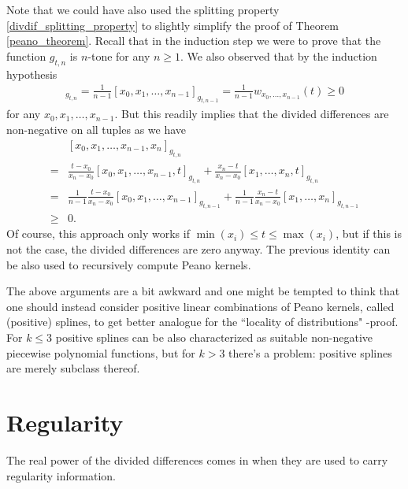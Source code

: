Note that we could have also used the splitting property \ref{divdif_splitting_property} to slightly simplify the proof of Theorem \ref{peano_theorem}. Recall that in the induction step we were to prove that the function $g_{t, n}$ is $n$-tone for any $n \geq 1$. We also observed that by the induction hypothesis
\begin{align*}
	[x_{0}, x_{1}, \ldots, x_{n - 1}, t]_{g_{t, n}} = \frac{1}{n - 1}[x_{0}, x_{1}, \ldots, x_{n - 1}]_{g_{t, n - 1}} =  \frac{1}{n - 1} w_{x_{0}, \ldots, x_{n - 1}}(t)\geq 0
\end{align*}
for any $x_{0}, x_{1}, \ldots, x_{n - 1}$. But this readily implies that the divided differences are non-negative on all tuples as we have
\begin{align*}
	& [x_{0}, x_{1}, \ldots, x_{n - 1}, x_{n}]_{g_{t, n}} \\
	=& \frac{t - x_{0}}{x_{n} - x_{0}} [x_{0}, x_{1}, \ldots, x_{n - 1}, t]_{g_{t, n}} + \frac{x_{n} - t}{x_{n} - x_{0}} [x_{1}, \ldots, x_{n}, t]_{g_{t, n}} \\
	=& \frac{1}{n - 1} \frac{t - x_{0}}{x_{n} - x_{0}} [x_{0}, x_{1}, \ldots, x_{n - 1}]_{g_{t, n - 1}} + \frac{1}{n - 1}\frac{x_{n} - t}{x_{n} - x_{0}} [x_{1}, \ldots, x_{n}]_{g_{t, n - 1}} \\
	\geq & 0.
\end{align*}
Of course, this approach only works if $\min(x_{i}) \leq t \leq \max(x_{i})$, but if this is not the case, the divided differences are zero anyway. The previous identity can be also used to recursively compute Peano kernels.

\begin{huom}
	The above arguments are a bit awkward and one might be tempted to think that one should instead consider positive linear combinations of Peano kernels, called (positive) splines, to get better analogue for the ``locality of distributions" -proof. For $k \leq 3$ positive splines can be also characterized as suitable non-negative piecewise polynomial functions, but for $k > 3$ there's a problem: positive splines are merely subclass thereof.
\end{huom}

\section{Regularity}

The real power of the divided differences comes in when they are used to carry regularity information.

